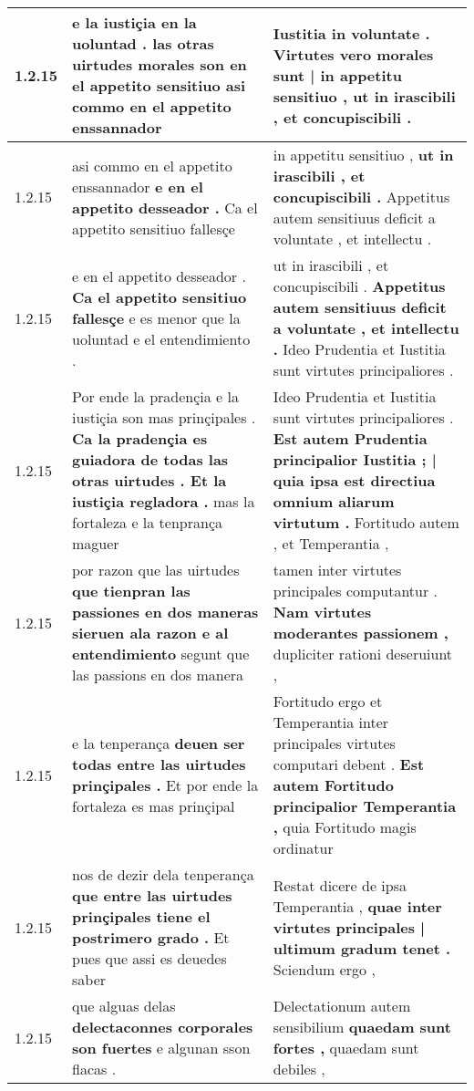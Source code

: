 \begin{tabular}{|p{1cm}|p{6.5cm}|p{6.5cm}|}
1.2.15 & e la iustiçia en la uoluntad . \textbf{ las otras uirtudes morales son en el appetito sensitiuo } asi commo en el appetito enssannador & Iustitia in voluntate . \textbf{ Virtutes vero morales sunt | in appetitu sensitiuo , } ut in irascibili , et concupiscibili . \\\hline
1.2.15 & asi commo en el appetito enssannador \textbf{ e en el appetito desseador . } Ca el appetito sensitiuo fallesçe & in appetitu sensitiuo , \textbf{ ut in irascibili , et concupiscibili . } Appetitus autem sensitiuus deficit a voluntate , et intellectu . \\\hline
1.2.15 & e en el appetito desseador . \textbf{ Ca el appetito sensitiuo fallesçe } e es menor que la uoluntad e el entendimiento . & ut in irascibili , et concupiscibili . \textbf{ Appetitus autem sensitiuus deficit a voluntate , et intellectu . } Ideo Prudentia et Iustitia sunt virtutes principaliores . \\\hline
1.2.15 & Por ende la pradençia e la iustiçia son mas prinçipales . \textbf{ Ca la pradençia es guiadora de todas las otras uirtudes . Et la iustiçia regladora . } mas la fortaleza e la tenprança maguer & Ideo Prudentia et Iustitia sunt virtutes principaliores . \textbf{ Est autem Prudentia principalior Iustitia ; | quia ipsa est directiua omnium aliarum virtutum . } Fortitudo autem , et Temperantia , \\\hline
1.2.15 & por razon que las uirtudes \textbf{ que tienpran las passiones en dos maneras sieruen ala razon e al entendimiento } segunt que las passions en dos manera & tamen inter virtutes principales computantur . \textbf{ Nam virtutes moderantes passionem , } dupliciter rationi deseruiunt , \\\hline
1.2.15 & e la tenperança \textbf{ deuen ser todas entre las uirtudes prinçipales . } Et por ende la fortaleza es mas prinçipal & Fortitudo ergo et Temperantia inter principales virtutes computari debent . \textbf{ Est autem Fortitudo principalior Temperantia , } quia Fortitudo magis ordinatur \\\hline
1.2.15 & nos de dezir dela tenperança \textbf{ que entre las uirtudes prinçipales tiene el postrimero grado . } Et pues que assi es deuedes saber & Restat dicere de ipsa Temperantia , \textbf{ quae inter virtutes principales | ultimum gradum tenet . } Sciendum ergo , \\\hline
1.2.15 & que alguas delas \textbf{ delectaconnes corporales son fuertes } e algunan sson flacas . & Delectationum autem sensibilium \textbf{ quaedam sunt fortes , } quaedam sunt debiles , \\\hline

\end{tabular}
